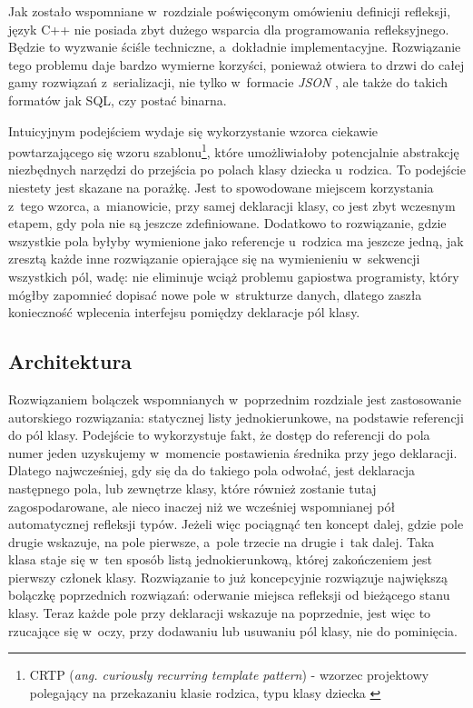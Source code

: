 \documentclass[12pt]{article}
\newcommand{\n}{\newline}
\newcommand{\nonpl}[1]{{\it #1}}
\newcommand{\ang}[1]{\nonpl{ang. #1}}
\newcommand{\JSON}{\nonpl{JSON} }
\begin{document}
{{			Jak zostało wspomniane w~rozdziale poświęconym omówieniu definicji refleksji, język C++ nie posiada zbyt dużego wsparcia dla programowania
			refleksyjnego. Będzie to wyzwanie ściśle techniczne, a~dokładnie implementacyjne. Rozwiązanie tego problemu daje bardzo wymierne korzyści,
			ponieważ otwiera to drzwi do całej gamy rozwiązań z~serializacji, nie tylko w~formacie \JSON, ale także do takich formatów jak SQL, czy
			postać binarna.\n

			Intuicyjnym podejściem wydaje się wykorzystanie wzorca ciekawie powtarzającego się wzoru szablonu\footnote{
				CRTP (\ang{curiously recurring template pattern}) - wzorzec projektowy polegający na przekazaniu klasie rodzica, typu klasy dziecka \cite{crtp_definition}
			}, które umożliwiałoby potencjalnie abstrakcję niezbędnych narzędzi do przejścia po polach klasy dziecka u~rodzica. To podejście niestety jest skazane na
			porażkę. Jest to spowodowane miejscem korzystania z~tego wzorca, a~mianowicie, przy samej deklaracji klasy, co jest zbyt wczesnym etapem, gdy pola nie są
			jeszcze zdefiniowane. Dodatkowo to rozwiązanie, gdzie wszystkie pola byłyby wymienione jako referencje u~rodzica ma jeszcze jedną, jak zresztą każde
			inne rozwiązanie opierające się na wymienieniu w~sekwencji wszystkich pól, wadę: nie eliminuje wciąż problemu gapiostwa programisty, który mógłby zapomnieć
			dopisać nowe pole w~strukturze danych, dlatego zaszła konieczność wplecenia interfejsu pomiędzy deklaracje pól klasy.
		}

		{
			\subsection{Architektura}

			Rozwiązaniem bolączek wspomnianych w~poprzednim rozdziale jest zastosowanie autorskiego rozwiązania: statycznej listy jednokierunkowe, na podstawie
			referencji do pól klasy. Podejście to wykorzystuje fakt, że dostęp do referencji do pola numer jeden uzyskujemy w~momencie postawienia średnika przy jego deklaracji.
			Dlatego najwcześniej, gdy się da do takiego pola odwołać, jest deklaracja następnego pola, lub zewnętrze klasy, które również zostanie tutaj zagospodarowane,
			ale nieco inaczej niż we wcześniej wspomnianej pół automatycznej refleksji typów. Jeżeli więc pociągnąć ten koncept dalej, gdzie pole drugie wskazuje, na
			pole pierwsze, a~pole trzecie na drugie i~tak dalej. Taka klasa staje się w~ten sposób listą jednokierunkową, której zakończeniem jest pierwszy członek klasy.
			Rozwiązanie to już koncepcyjnie rozwiązuje największą bolączkę poprzednich rozwiązań: oderwanie miejsca refleksji od bieżącego stanu klasy.
			Teraz każde pole przy deklaracji wskazuje na poprzednie, jest więc to rzucające się w~oczy, przy dodawaniu lub usuwaniu pól klasy, nie do pominięcia.\n

}}
\end{document}

